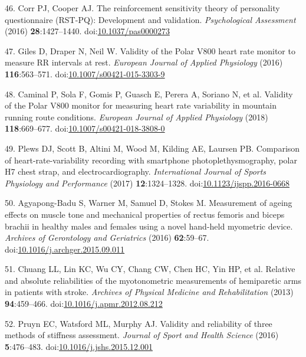 \documentclass[
  english,
  man]{apa6}
\newenvironment{cslreferences}%
  {}%
  {\par}
\begin{document}
\begin{cslreferences}
\leavevmode\hypertarget{ref-Corr2016c}{}%
46. Corr PJ, Cooper AJ. The reinforcement sensitivity theory of personality questionnaire (RST-PQ): Development and validation. \emph{Psychological Assessment} (2016) \textbf{28}:1427--1440. doi:\href{https://doi.org/10.1037/pas0000273}{10.1037/pas0000273}

\leavevmode\hypertarget{ref-Giles2016}{}%
47. Giles D, Draper N, Neil W. Validity of the Polar V800 heart rate monitor to measure RR intervals at rest. \emph{European Journal of Applied Physiology} (2016) \textbf{116}:563--571. doi:\href{https://doi.org/10.1007/s00421-015-3303-9}{10.1007/s00421-015-3303-9}

\leavevmode\hypertarget{ref-Caminal2018}{}%
48. Caminal P, Sola F, Gomis P, Guasch E, Perera A, Soriano N, et al. Validity of the Polar V800 monitor for measuring heart rate variability in mountain running route conditions. \emph{European Journal of Applied Physiology} (2018) \textbf{118}:669--677. doi:\href{https://doi.org/10.1007/s00421-018-3808-0}{10.1007/s00421-018-3808-0}

\leavevmode\hypertarget{ref-Plews2017}{}%
49. Plews DJ, Scott B, Altini M, Wood M, Kilding AE, Laursen PB. Comparison of heart-rate-variability recording with smartphone photoplethysmography, polar H7 chest strap, and electrocardiography. \emph{International Journal of Sports Physiology and Performance} (2017) \textbf{12}:1324--1328. doi:\href{https://doi.org/10.1123/ijspp.2016-0668}{10.1123/ijspp.2016-0668}

\leavevmode\hypertarget{ref-Agyapong-Badu2016}{}%
50. Agyapong-Badu S, Warner M, Samuel D, Stokes M. Measurement of ageing effects on muscle tone and mechanical properties of rectus femoris and biceps brachii in healthy males and females using a novel hand-held myometric device. \emph{Archives of Gerontology and Geriatrics} (2016) \textbf{62}:59--67. doi:\href{https://doi.org/10.1016/j.archger.2015.09.011}{10.1016/j.archger.2015.09.011}

\leavevmode\hypertarget{ref-Chuang2013}{}%
51. Chuang LL, Lin KC, Wu CY, Chang CW, Chen HC, Yin HP, et al. Relative and absolute reliabilities of the myotonometric measurements of hemiparetic arms in patients with stroke. \emph{Archives of Physical Medicine and Rehabilitation} (2013) \textbf{94}:459--466. doi:\href{https://doi.org/10.1016/j.apmr.2012.08.212}{10.1016/j.apmr.2012.08.212}

\leavevmode\hypertarget{ref-Pruyn2016}{}%
52. Pruyn EC, Watsford ML, Murphy AJ. Validity and reliability of three methods of stiffness assessment. \emph{Journal of Sport and Health Science} (2016) \textbf{5}:476--483. doi:\href{https://doi.org/10.1016/j.jshs.2015.12.001}{10.1016/j.jshs.2015.12.001}


\end{cslreferences}
\end{document}
